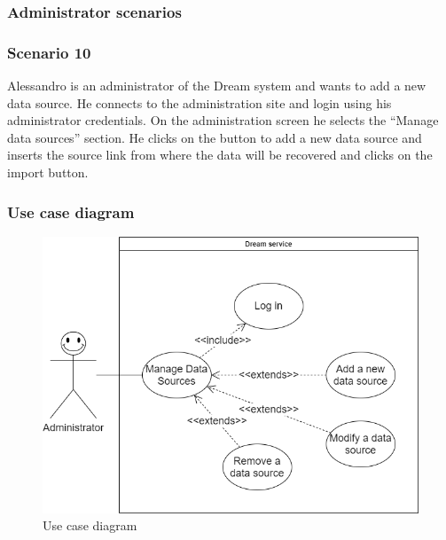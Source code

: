 
\subsubsection{Administrator scenarios}
\subsubsection*{Scenario 10}
Alessandro is an administrator of the Dream system and wants to add a new data source. He connects to the administration site and login using his administrator credentials. On the administration screen he selects the “Manage data sources” section. He clicks on the button to add a new data source and inserts the source link from where the data will be recovered and clicks on the import button.
\newpage
\subsubsection*{Use case diagram}
\begin{figure}[h!]
        \centering
        \includegraphics[scale=0.40]{images/use_cases_diagram/administrator_use_case.png}
        \caption{Use case diagram}
        \label{fig:administrator_use_case}
    \end{figure}
    \FloatBarrier
